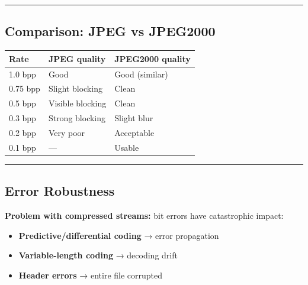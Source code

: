 \begin{center}\end{center}

\bigskip\hrule\bigskip

\subsection{Comparison: JPEG vs JPEG2000}

\begin{center}
\begin{tabular}{|l|l|l|}
\hline
\textbf{Rate} & \textbf{JPEG quality} & \textbf{JPEG2000 quality} \\ \hline
1.0 bpp & Good & Good (similar) \\ \hline
0.75 bpp & Slight blocking & Clean \\ \hline
0.5 bpp & Visible blocking & Clean \\ \hline
0.3 bpp & Strong blocking & Slight blur \\ \hline
0.2 bpp & Very poor & Acceptable \\ \hline
0.1 bpp & — & Usable \\ \hline
\end{tabular}
\end{center}

\begin{center}\end{center}

\bigskip\hrule\bigskip

\subsection{Error Robustness}

\textbf{Problem with compressed streams:} bit errors have catastrophic impact:
\begin{itemize}
\item \textbf{Predictive/differential coding} → error propagation
\item \textbf{Variable-length coding} → decoding drift
\item \textbf{Header errors} → entire file corrupted
\end{itemize}

